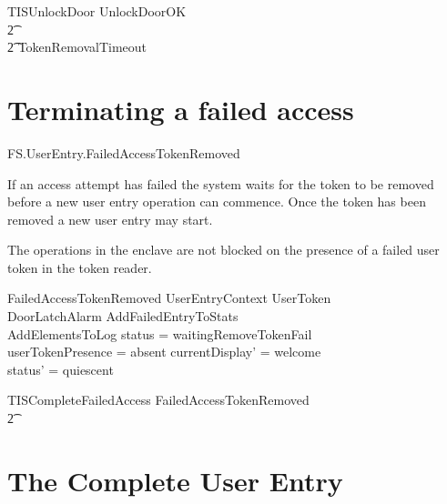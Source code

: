 \begin{zed}
        TISUnlockDoor  UnlockDoorOK 
\\      \t2 \lor [ WaitingTokenRemoval |status =
waitingRemoveTokenSuccess ]
\\      \t2 \lor TokenRemovalTimeout
\end{zed}
 
\section{Terminating a failed access}

\begin{traceunit}{FS.UserEntry.FailedAccessTokenRemoved}
\end{traceunit}

If an access attempt has failed the system waits for the token to be
removed before a new user entry operation can commence. Once the token has been
removed a new user entry may start.

The operations in the enclave are not blocked on the presence of a
failed user token in the token reader. 

\begin{schema}{FailedAccessTokenRemoved}
        UserEntryContext
\also
	\Xi UserToken
\\      \Xi DoorLatchAlarm
\also
        AddFailedEntryToStats
\\      AddElementsToLog
\where
        status = waitingRemoveTokenFail
\\      userTokenPresence = absent
\also
        currentDisplay' = welcome
\\      status' = quiescent
\end{schema}

\begin{zed}
        TISCompleteFailedAccess  FailedAccessTokenRemoved 
\\      \t2     \lor [ WaitingTokenRemoval | status = waitingRemoveTokenFail ] 
\end{zed}

\section{The Complete User Entry}


